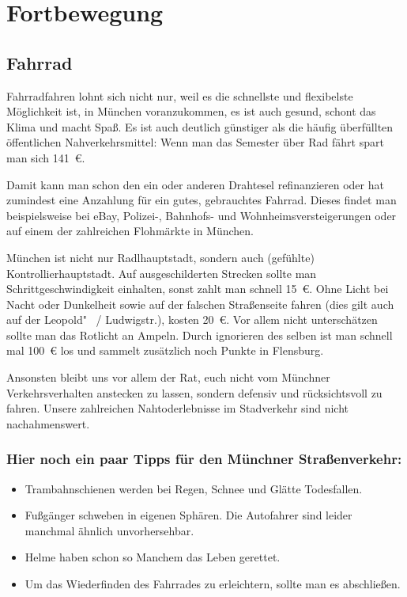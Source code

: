 ﻿
\chapter{Fortbewegung}

\section{Fahrrad}

Fahrradfahren lohnt sich nicht nur, weil es die schnellste und
flexibelste Möglichkeit ist, in München voranzukommen, es ist auch
gesund, schont das Klima und macht Spaß.  Es ist auch deutlich
günstiger als die häufig überfüllten öffentlichen Nahverkehrsmittel:
Wenn man das Semester über Rad fährt spart man sich 141~€.

Damit kann man schon den ein oder anderen Drahtesel refinanzieren oder
hat zumindest eine Anzahlung für ein gutes, gebrauchtes Fahrrad. Dieses
findet man beispielsweise bei eBay, Polizei-, Bahnhofs- und
Wohnheimsversteigerungen oder auf einem der zahlreichen Flohmärkte in
München. 

München ist nicht nur Radlhauptstadt, sondern auch (gefühlte)
Kontrollierhauptstadt. Auf ausgeschilderten Strecken sollte man Schrittgeschwindigkeit
einhalten, sonst zahlt man schnell 15~€. Ohne Licht bei Nacht oder
Dunkelheit sowie auf der falschen Straßenseite fahren
(dies gilt auch auf der Leopold"~ / Ludwigstr.), kosten 20~€.  Vor allem nicht unterschätzen sollte man das Rotlicht
an Ampeln. Durch ignorieren des selben ist man schnell mal 100~€ los und sammelt
zusätzlich noch Punkte in Flensburg.

Ansonsten bleibt uns vor allem der Rat, euch nicht vom Münchner
Verkehrsverhalten anstecken zu lassen, sondern defensiv und rücksichtsvoll zu
fahren. Unsere zahlreichen Nahtoderlebnisse im Stadverkehr sind nicht
nachahmenswert.

\subsection*{Hier noch ein paar Tipps für den Münchner Straßenverkehr:}
\begin{itemize}
	\item Trambahnschienen werden bei Regen, Schnee und Glätte Todesfallen.
	\item Fußgänger schweben in eigenen Sphären. Die Autofahrer sind leider 
				manchmal ähnlich unvorhersehbar.
	\item Helme haben schon so Manchem das Leben gerettet.
	\item Um das Wiederfinden des Fahrrades zu erleichtern, sollte man es 
				abschließen.
\end{itemize}

